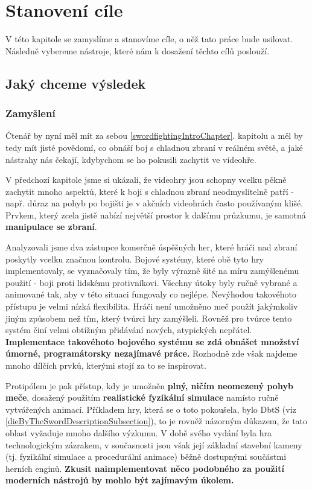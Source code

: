 \chapter{Stanovení cíle} \label{goalSettingChapter}

V této kapitole se zamyslíme a stanovíme cíle, o něž tato práce bude usilovat. Následně vybereme nástroje, které nám k dosažení těchto cílů poslouží.  


\section{Jaký chceme výsledek}

\subsection{Zamyšlení}
Čtenář by nyní měl mít za sebou \ref{swordfightingIntroChapter}. kapitolu a měl by tedy mít jisté povědomí, co obnáší boj s chladnou zbraní v reálném světě, a jaké nástrahy nás čekají, kdybychom se ho pokusili zachytit ve videohře. 

V předchozí kapitole jsme si ukázali, že videohry jsou schopny vcelku pěkně zachytit mnoho aspektů, které k boji s chladnou zbraní neodmyslitelně patří - např. důraz na pohyb po bojišti je v akčních videohrách často používaným klišé. Prvkem, který zcela jistě nabízí největší prostor k dalšímu průzkumu, je samotná \textbf{manipulace se zbraní}.

Analyzovali jsme dva zástupce komerčně úspěšných her, které hráči nad zbraní poskytly vcelku značnou kontrolu. Bojové systémy, které obě tyto hry implementovaly, se vyznačovaly tím, že byly výrazně šité na míru zamýšlenému použití - boji proti lidskému protivníkovi. Všechny útoky byly ručně vybrané a animované tak, aby v této situaci fungovaly co nejlépe. Nevýhodou takovéhoto přístupu je velmi nízká flexibilita. Hráči není umožněno meč použít jakýmkoliv jiným způsobem než tím, který tvůrci hry zamýšleli. Rovněž pro tvůrce tento systém činí velmi obtížným přidávání nových, atypických nepřátel. \textbf{Implementace takovéhoto bojového systému se zdá obnášet množství úmorné, programátorsky nezajímavé práce.} Rozhodně zde však najdeme mnoho dílčích prvků, kterými stojí za to se inspirovat.

Protipólem je pak přístup, kdy je umožněn \textbf{plný, ničím neomezený pohyb meče}, dosažený použitím \textbf{realistické fyzikální simulace} namísto ručně vytvářených animací. Příkladem hry, která se o toto pokoušela, bylo \acl{DbtS} (viz \ref{dieByTheSwordDescriptionSubsection}), to je rovněž názorným důkazem, že tato oblast vyžaduje mnoho dalšího výzkumu. V době svého vydání byla hra technologickým zázrakem, v současnosti jsou však její základní stavební kameny (tj. fyzikální simulace a procedurální animace) běžně dostupnými součástmi herních enginů. \textbf{Zkusit naimplementovat něco podobného za použití moderních nástrojů by mohlo být zajímavým úkolem.}

